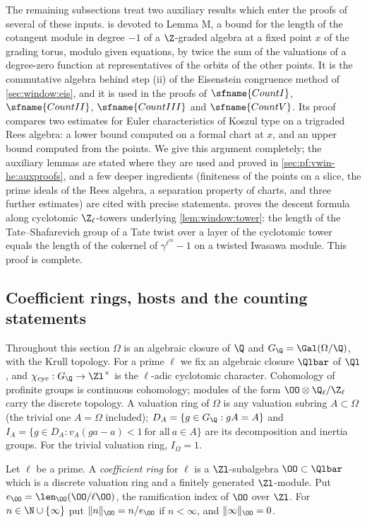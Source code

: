 The remaining subsections treat two auxiliary results which enter the proofs of several of these inputs.
 is devoted to Lemma M, a bound for the length of the cotangent module in degree $-1$
of a $\Z$-graded algebra at a fixed point $x$ of the grading torus, modulo given equations, by twice the sum of the
valuations of a degree-zero function at representatives of the orbits of the other points. It is the commutative
algebra behind step (ii) of the Eisenstein congruence method of \cref{sec:window:eis}, and it is used in the proofs
of $\sfname{CountI}$, $\sfname{CountII}$, $\sfname{CountIII}$ and $\sfname{CountV}$. Its proof compares two
estimates for Euler characteristics of Koszul type on a trigraded Rees algebra: a lower bound computed on a formal
chart at $x$, and an upper bound computed from the points. We give this argument completely; the auxiliary lemmas
are stated where they are used and proved in \cref{sec:pf:vwin-he:auxproofs}, and a few deeper ingredients
(finiteness of the points on a slice, the prime ideals of the Rees algebra, a separation property of charts, and
three further estimates) are cited with precise statements.  proves the descent formula along
cyclotomic $\Z_\ell$-towers underlying \cref{lem:window:tower}: the length of the Tate--Shafarevich group of a
Tate twist over a layer of the cyclotomic tower equals the length of the cokernel of $\gamma^{\ell^m}-1$ on a
twisted Iwasawa module. This proof is complete.

\subsection{Coefficient rings, hosts and the counting statements}\label{sec:pf:vwin-he:counts}

Throughout this section $\Omega$ is an algebraic closure of $\Q$ and $G_\Q=\Gal(\Omega/\Q)$, with the Krull
topology. For a prime $\ell$ we fix an algebraic closure $\Qlbar$ of $\Ql$, and $\vwinhecyc:G_\Q\to\Zl^\times$ is
the $\ell$-adic cyclotomic character. Cohomology of profinite groups is continuous cohomology; modules of the form
$\OO\otimes\vwinheQZ$ carry the discrete topology. A valuation ring of $\Omega$ is any valuation subring
$A\subset\Omega$ (the trivial one $A=\Omega$ included); $D_A=\{g\in G_\Q: gA=A\}$ and
$I_A=\{g\in D_A: v_A(ga-a)<1\ \text{for all}\ a\in A\}$ are its decomposition and inertia groups. For the trivial
valuation ring, $I_\Omega=1$.

\begin{definition}\label{pf:vwin-he:coef}
Let $\ell$ be a prime. A \emph{coefficient ring} for $\ell$ is a $\Zl$-subalgebra $\OO\subset\Qlbar$ which is a
discrete valuation ring and a finitely generated $\Zl$-module. Put $e_\OO=\len_\OO(\OO/\ell\OO)$, the
ramification index of $\OO$ over $\Zl$. For $n\in\N\cup\{\infty\}$ put $\|n\|_\OO=n/e_\OO$ if $n<\infty$, and
$\|\infty\|_\OO=0$.
\end{definition}

